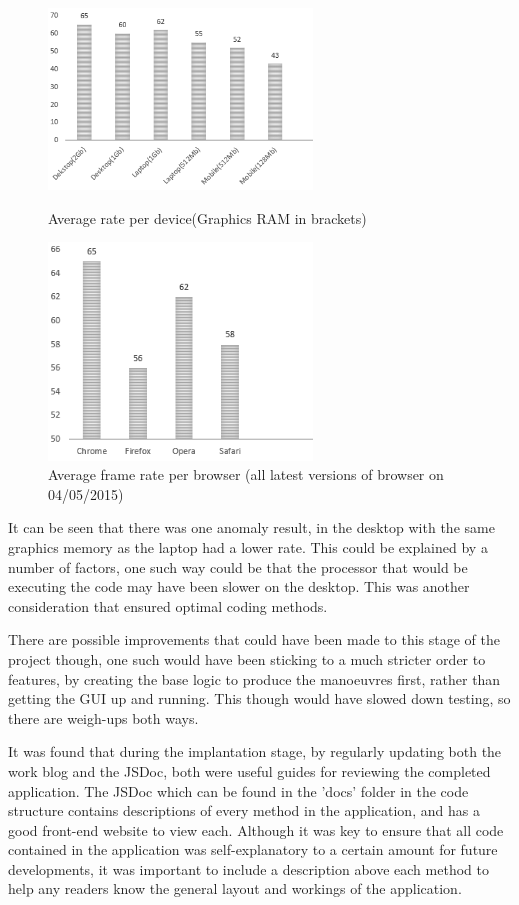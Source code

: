 \begin{figure}[h!]
\centering
\parbox{7cm}{
\includegraphics[width=7cm]{images/fpsMeasured.png}
\caption{Average rate per device(Graphics RAM in brackets)}
\label{fig:framerateDevices}}
\qquad
\begin{minipage}{7cm}
\includegraphics[width=7cm]{images/fpsMeasuredBrowsers.png}
\caption{Average frame rate per browser (all latest versions of browser on 04/05/2015)}
\label{fig:framerateDevicesBrowsers}
\end{minipage}
\end{figure}

It can be seen that there was one anomaly result, in the desktop with the same graphics memory as the laptop had a lower rate. This could be explained by a number of factors, one such way could be that the processor that would be executing the code may have been slower on the desktop. This was another consideration that ensured optimal coding methods.

There are possible improvements that could have been made to this stage of the project though, one such would have been sticking to a much stricter order to features, by creating the base logic to produce the manoeuvres first, rather than getting the GUI up and running. This though would have slowed down testing, so there are weigh-ups both ways.

It was found that during the implantation stage, by regularly updating both the work blog \cite{blog} and the JSDoc, both were useful guides for reviewing the completed application. The JSDoc which can be found in the 'docs' folder in the code structure contains descriptions of every method in the application, and has a good front-end website to view each. Although it was key to ensure that all code contained in the application was self-explanatory to a certain amount for future developments, it was important to include a description above each method to help any readers know the general layout and workings of the application. 

